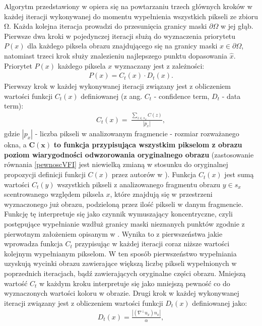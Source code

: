 \documentclass[12pt, twoside, openany]{report}
\theoremstyle{definition}
\begin{document}
Algorytm przedstawiony w \cite{criminisi2004region} opiera się na powtarzaniu trzech głównych kroków w każdej iteracji wykonywanej do momentu wypełnienia wszystkich pikseli ze zbioru $\mathrm{\Omega }$.
Każda kolejna iteracja prowadzi do przesunięcia granicy maski $\partial \Omega$ w jej głąb. Pierwsze dwa kroki w pojedynczej iteracji służą do wyznaczenia priorytetu $P\left(x\right)$ dla każdego piksela obrazu znajdującego się na granicy maski $x \in \partial \Omega$, natomiast trzeci krok służy znalezieniu najlepszego punktu dopasowania $\hat{x}$.
Priorytet $P \left( x \right)$ każdego piksela $x$ wyznaczany jest z zależności:
\begin{align}
P\left( x \right)=C_t(x)\cdot D_t(x).
\label{PRIORITY}
\end{align}
Pierwszy krok w każdej wykonywanej iteracji związany jest z obliczeniem wartości funkcji $C_t(x)$ definiowanej (z ang. $C_t$ - confidence term, $D_t$ - data term):
\begin{align}
C_t\left( x \right)=\ \frac{\sum_{z \in s_x} {C(z)}}{\left|p_x\right|},
\label{confidenceTerm}
\end{align}
gdzie $\left| p_x\right |$ - liczba pikseli w analizowanym fragmencie - rozmiar rozważanego okna,
a $\mathbf{C(x)}$ \textbf{to funkcja przypisująca wszystkim pikselom z obrazu poziom wiarygodności odwzorowania oryginalnego obrazu}
(zastosowanie równania \eqref{pewnoscVFI} jest niewielką zmianą w stosunku do oryginalnej propozycji definicji funkcji $C(x)$ przez autorów w \cite{criminisi2004region}). Funkcja $C_t(x)$ jest sumą wartości $C_t(y)$ wszystkich pikseli z analizowanego fragmentu obrazu $y \in s_x$ scentrowanego względem piksela $x$, które znajdują się w przestrzeni wyznaczonego już obrazu, podzieloną przez ilość pikseli w danym fragmencie. Funkcję tę interpretuje się jako czynnik wymuszający koncentryczne, czyli postępujące wypełnianie wzdłuż granicy maski nieznanych punktów zgodnie z pierwotnym założeniem opisanym w \cite{efros1999texture}. Wynika to z pierwszeństwa jakie wprowadza funkcja $C_t$ przypisując w każdej iteracji coraz niższe wartości kolejnym wypełnianym pikselom. W ten sposób pierwszeństwo wypełniania uzyskują wycinki obrazu zawierające większą liczbę pikseli wypełnionych w poprzednich iteracjach, bądź zawierających oryginalne części obrazu. Mniejszą wartość $C_t$ w każdym kroku interpretuje się jako mniejszą pewność co do wyznaczonych wartości koloru w obrazie.
Drugi krok w każdej wykonywanej iteracji związany jest z obliczeniem wartości funkcji $D_t(x)$ definiowanej jako:
\begin{align}
D_t(x)= \frac{\left|\left( \nabla^{\bot}u_x \right) n_x\right|}{\alpha },
\label{DataTerm}
\end{align}
\end{document}
